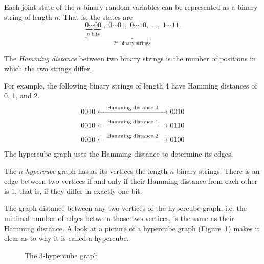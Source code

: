 \documentclass[cclicense]{hmcthesis}
\numberwithin{equation}{chapter}
\numberwithin{thmcounter}{chapter}
\begin{document}
    Each joint state of the $n$ binary random variables can be represented as a
    binary string of length $n$.  That is, the states are
    \[
        \underbrace{
        \underbrace{0\cdots00}_\text{$n$ bits}\;,\;
        0\cdots01,\;
        0\cdots10,\;
        \ldots,\;
        1\cdots11
        }_\text{$2^n$ binary strings}.
    \]
    \begin{definition}
    The \emph{Hamming distance} between two binary strings is the number of
    positions in which the two strings differ.  
    \end{definition}
    For example, the following binary strings of length 4 have Hamming distances
    of 0, 1, and 2.
    \begin{align*}
        0010 &\xleftrightarrow{\quad\text{Hamming distance $0$}\quad} 0010 \\
        0010 &\xleftrightarrow{\quad\text{Hamming distance $1$}\quad} 0110 \\
        0010 &\xleftrightarrow{\quad\text{Hamming distance $2$}\quad} 0100
    \end{align*}
    The hypercube graph uses the Hamming distance to determine its edges.
    \begin{definition}
        The \emph{$n$-hypercube} graph has as its vertices the length-$n$ binary
        strings.  There is an edge between two vertices if and only if
        their Hamming distance from each other is 1, that is, if they differ in
        exactly one bit.
    \end{definition}
    The graph distance between any two vertices of the hypercube graph, i.e. the
    minimal number of edges between those two vertices, is the same as their
    Hamming distance.  A look at a picture of a hypercube graph
    (Figure~\ref{fig:hypercube}) makes it clear as to why it is called a
    hypercube.


    \begin{figure}[h]
        \centering


        \caption{The $3$-hypercube graph}
        \label{fig:hypercube}
    \end{figure}
    
\end{document}
